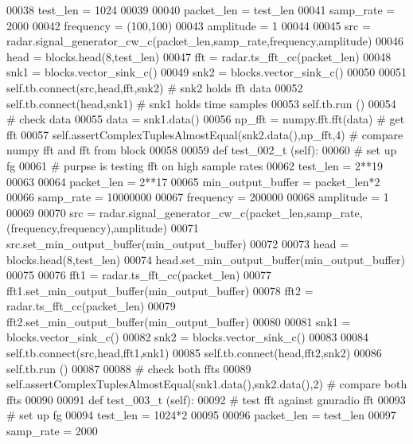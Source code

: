 \begin{DoxyCode}
00038         test\_len = 1024
00039 
00040         packet\_len = test\_len
00041         samp\_rate = 2000
00042         frequency = (100,100)
00043         amplitude = 1
00044 
00045         src = radar.signal\_generator\_cw\_c(packet\_len,samp\_rate,frequency,amplitude)
00046         head = blocks.head(8,test\_len)
00047         fft = radar.ts\_fft\_cc(packet\_len)
00048         snk1 = blocks.vector\_sink\_c()
00049         snk2 = blocks.vector\_sink\_c()
00050 
00051         self.tb.connect(src,head,fft,snk2) \textcolor{comment}{# snk2 holds fft data}
00052         self.tb.connect(head,snk1) \textcolor{comment}{# snk1 holds time samples}
00053         self.tb.run ()
00054         \textcolor{comment}{# check data}
00055         data = snk1.data()
00056         np\_fft = numpy.fft.fft(data) \textcolor{comment}{# get fft}
00057         self.assertComplexTuplesAlmostEqual(snk2.data(),np\_fft,4) \textcolor{comment}{# compare numpy fft and fft from block}
00058 
00059     \textcolor{keyword}{def }test_002_t (self):
00060         \textcolor{comment}{# set up fg}
00061         \textcolor{comment}{# purpse is testing fft on high sample rates}
00062         test\_len = 2**19
00063 
00064         packet\_len = 2**17
00065         min\_output\_buffer = packet\_len*2
00066         samp\_rate = 10000000
00067         frequency = 200000
00068         amplitude = 1
00069 
00070         src = radar.signal\_generator\_cw\_c(packet\_len,samp\_rate,(frequency,frequency),amplitude)
00071         src.set\_min\_output\_buffer(min\_output\_buffer)
00072 
00073         head = blocks.head(8,test\_len)
00074         head.set\_min\_output\_buffer(min\_output\_buffer)
00075 
00076         fft1 = radar.ts\_fft\_cc(packet\_len)
00077         fft1.set\_min\_output\_buffer(min\_output\_buffer)
00078         fft2 = radar.ts\_fft\_cc(packet\_len)
00079         fft2.set\_min\_output\_buffer(min\_output\_buffer)
00080 
00081         snk1 = blocks.vector\_sink\_c()
00082         snk2 = blocks.vector\_sink\_c()
00083 
00084         self.tb.connect(src,head,fft1,snk1)
00085         self.tb.connect(head,fft2,snk2)
00086         self.tb.run ()
00087 
00088         \textcolor{comment}{# check both ffts}
00089         self.assertComplexTuplesAlmostEqual(snk1.data(),snk2.data(),2) \textcolor{comment}{# compare both ffts}
00090 
00091     \textcolor{keyword}{def }test_003_t (self):
00092         \textcolor{comment}{# test fft against gnuradio fft}
00093         \textcolor{comment}{# set up fg}
00094         test\_len = 1024*2
00095 
00096         packet\_len = test\_len
00097         samp\_rate = 2000

\end{DoxyCode}

